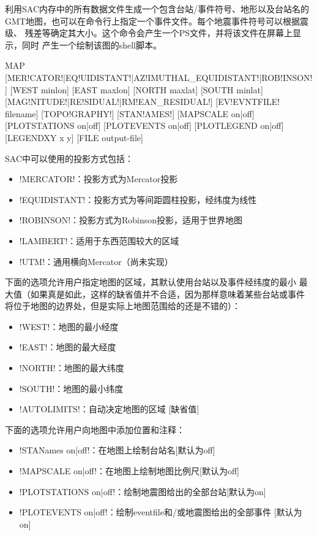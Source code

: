 \label{cmd:map}

利用SAC内存中的所有数据文件生成一个包含台站/事件符号、地形以及台站名的
GMT地图，也可以在命令行上指定一个事件文件。每个地震事件符号可以根据震级、
残差等确定其大小。这个命令会产生一个PS文件，并将该文件在屏幕上显示，同时
产生一个绘制该图的shell脚本。

\begin{SACSTX}
MAP [MER!CATOR!|EQ!UIDISTANT!|AZ!IMUTHAL_EQUIDISTANT!|ROB!INSON!]
    [WEST minlon] [EAST maxlon] [NORTH maxlat] [SOUTH minlat]
    [MAG!NITUDE!|RE!SIDUAL!|RM!EAN_RESIDUAL!] [EV!EVNTFILE! filename]
    [TOPO!GRAPHY!] [STAN!AMES!] [MAPSCALE on|off] [PLOTSTATIONS on|off]
    [PLOTEVENTS on|off] [PLOTLEGEND on|off] [LEGENDXY x y]
    [FILE output-file]
\end{SACSTX}

SAC中可以使用的投影方式包括：
\begin{itemize}
\item !MERCATOR!：投影方式为Mercator投影
\item !EQUIDISTANT!：投影方式为等间距圆柱投影，经纬度为线性
\item !ROBINSON!：投影方式为Robinson投影，适用于世界地图
\item !LAMBERT!：适用于东西范围较大的区域
\item !UTM!：通用横向Mercator（尚未实现）
\end{itemize}

下面的选项允许用户指定地图的区域，其默认使用台站以及事件经纬度的最小
最大值（如果真是如此，这样的缺省值并不合适，因为那样意味着某些台站或事件
将位于地图的边界处，但是实际上地图范围给的还是不错的）：
\begin{itemize}
\item !WEST!：地图的最小经度
\item !EAST!：地图的最大经度
\item !NORTH!：地图的最大纬度
\item !SOUTH!：地图的最小纬度
\item !AUTOLIMITS!：自动决定地图的区域 [缺省值]
\end{itemize}

下面的选项允许用户向地图中添加位置和注释：
\begin{itemize}
\item !STANames on|off!：在地图上绘制台站名[默认为off]
\item !MAPSCALE on|off!：在地图上绘制地图比例尺[默认为off]
\item !PLOTSTATIONS on|off!：绘制地震图给出的全部台站[默认为on]
\item !PLOTEVENTS on|off!：绘制eventfile和/或地震图给出的全部事件
    [默认为on]
\end{itemize}

